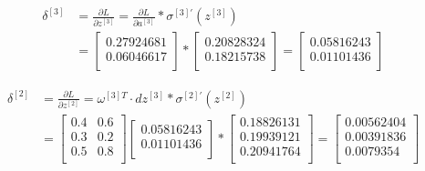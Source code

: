 \documentclass{article}
\begin{document}
\[
    \begin{aligned}
        \delta^{[3]} & = \frac{\partial L}{\partial z^{[3]}} = \frac{\partial L}{\partial a^{[3]}}*\sigma^{[3]'}(z^{[3]}) \\
                     & = \begin{bmatrix}
                             0.27924681 \\
                             0.06046617 \\
                         \end{bmatrix}
        * \begin{bmatrix}
              0.20828324 \\
              0.18215738 \\
          \end{bmatrix}
        = \begin{bmatrix}
              0.05816243 \\
              0.01101436 \\
          \end{bmatrix}
    \end{aligned}
\]

\[
    \begin{aligned}
        \delta^{[2]} & = \frac{\partial L}{\partial z^{[2]}} = \omega^{[3]T}\cdot dz^{[3]}*\sigma^{[2]'}(z^{[2]}) \\
                     & = \begin{bmatrix}
                             0.4 & 0.6 \\
                             0.3 & 0.2 \\
                             0.5 & 0.8 \\
                         \end{bmatrix}
        \begin{bmatrix}
            0.05816243 \\
            0.01101436 \\
        \end{bmatrix}
        * \begin{bmatrix}
              0.18826131 \\
              0.19939121 \\
              0.20941764 \\
          \end{bmatrix}
        = \begin{bmatrix}
              0.00562404 \\
              0.00391836 \\
              0.0079354  \\
          \end{bmatrix}
    \end{aligned}
\]
\end{document}
